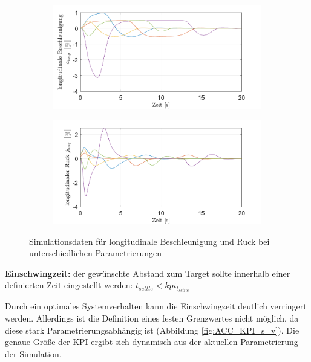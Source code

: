 \begin{figure}[ht]
    \centering
    \begin{subfigure}[b]{.49\textwidth}
        \centering
        \includegraphics[width=\textwidth]{figures/3_Implementierung/ACC_Vel_Const/ACC_Vel_Const_a-Long.pdf}
    \end{subfigure}
    \hfill
    \begin{subfigure}[b]{.49\textwidth}
        \centering
        \includegraphics[width=\textwidth]{figures/3_Implementierung/ACC_Vel_Const/ACC_Vel_Const_j-Long.pdf}
    \end{subfigure}
    \caption{Simulationsdaten für longitudinale Beschleunigung und Ruck bei unterschiedlichen Parametrierungen}
    \label{fig:ACC_KPI_a_j}
\end{figure}

\medskip\noindent\textbf{Einschwingzeit:} der gewünschte Abstand zum Target sollte innerhalb einer definierten Zeit eingestellt werden: $t_{settle} < kpi_{t_{settle}}$

\noindent Durch ein optimales Systemverhalten kann die Einschwingzeit deutlich verringert werden. Allerdings ist die Definition eines festen Grenzwertes nicht möglich, da diese stark Parametrierungsabhängig ist (Abbildung \ref{fig:ACC_KPI_s_v}). Die genaue Größe der KPI ergibt sich dynamisch aus der aktuellen Parametrierung der Simulation.

